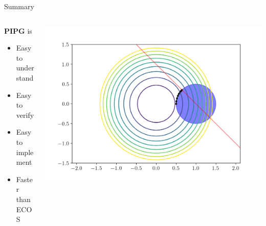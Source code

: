 \documentclass[aspectratio=169]{beamer}
\begin{document}
\begin{frame}{Summary}
    \begin{columns}[T]
        \begin{column}{0.35\textwidth}
            \textbf{PIPG} is
            \begin{itemize}
                \item Easy to understand
                \item Easy to verify
                \item Easy to implement
                \item Faster than ECOS
            \end{itemize}        
        \end{column}
        \begin{column}{0.65\textwidth}
            \includegraphics[width=\textwidth]{img/pipg_candy.png}
        \end{column}
    \end{columns}
\end{frame}
\end{document}
